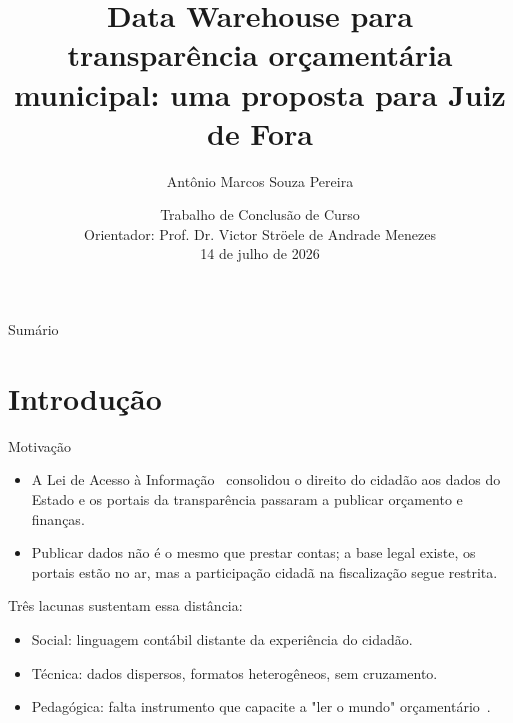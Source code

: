 \documentclass[aspectratio=169]{beamer}
\title{Data Warehouse para transparência orçamentária municipal: uma proposta para Juiz de Fora}
\author{Antônio Marcos Souza Pereira}
\institute{Departamento de Ciência da Computação \\ Universidade Federal de Juiz de Fora}
\date{Trabalho de Conclusão de Curso \\ Orientador: Prof. Dr. Victor Ströele de Andrade Menezes \\ 14 de julho de 2026}
\begin{document}

{
\begin{frame}
  \maketitle
\end{frame}
}

\begin{frame}{Sumário}
  \tableofcontents
\end{frame}


\section{Introdução}
\begin{frame}{Motivação}
  \begin{itemize}
    \item A Lei de Acesso à Informação~\citep{Lei:12.527:2011} consolidou o direito do cidadão aos dados do Estado e os portais da transparência passaram a publicar orçamento e finanças.
    \item Publicar dados não é o mesmo que prestar contas; a base legal existe, os portais estão no ar, mas a participação cidadã na fiscalização segue restrita.
  \end{itemize}
  \begin{block}{Três lacunas sustentam essa distância:}
    \begin{itemize}
      \item Social: linguagem contábil distante da experiência do cidadão.
      \item Técnica: dados dispersos, formatos heterogêneos, sem cruzamento.
      \item Pedagógica: falta instrumento que capacite a "ler o mundo" orçamentário~\citep{freire1967liberdade}.
    \end{itemize}
  \end{block}
\end{frame}
\end{document}
